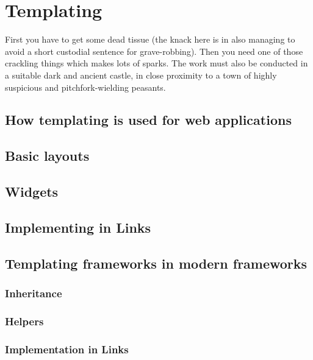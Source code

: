 
\chapter{Templating}

First you have to get some dead tissue (the knack here is in also managing to
avoid a short custodial sentence for grave-robbing). Then you need one of
those crackling things which makes lots of sparks. The work must also be
conducted in a suitable dark and ancient castle, in close proximity to a town
of highly suspicious and pitchfork-wielding peasants.

\section{How templating is used for web applications}

\section{Basic layouts}

\section{Widgets}

\section{Implementing in Links}

\section{Templating frameworks in modern frameworks}

\subsection{Inheritance}

\subsection{Helpers}

\subsection{Implementation in Links}
